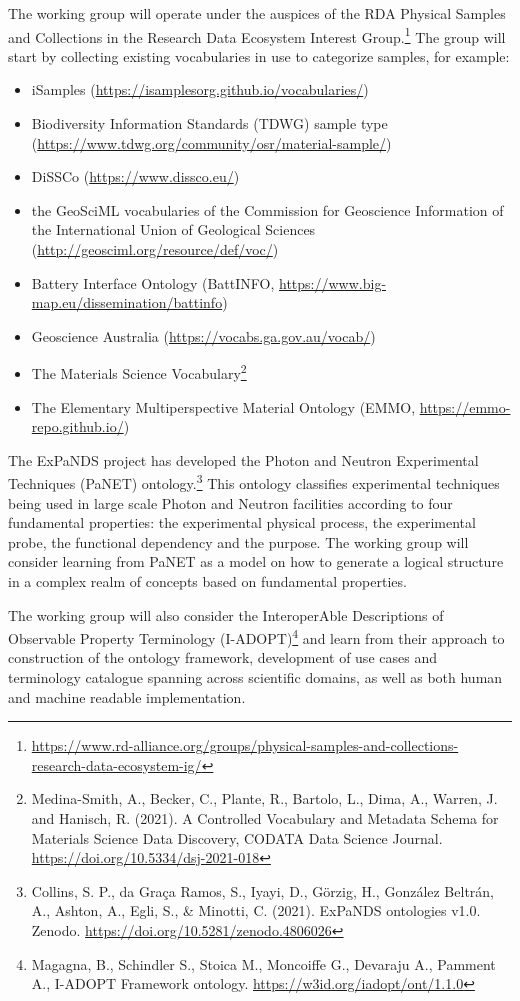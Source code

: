 \documentclass{scrartcl}
\begin{document}
The working group will operate under the auspices of the RDA Physical
Samples and Collections in the Research Data Ecosystem Interest
Group.\footnote{\url{https://www.rd-alliance.org/groups/physical-samples-and-collections-research-data-ecosystem-ig/}}
The group will start by collecting existing vocabularies in use to
categorize samples, for example:
\begin{itemize}
\item iSamples (\url{https://isamplesorg.github.io/vocabularies/})
\item Biodiversity Information Standards (TDWG) sample type
  (\url{https://www.tdwg.org/community/osr/material-sample/})
\item DiSSCo (\url{https://www.dissco.eu/})
\item the GeoSciML vocabularies of the Commission for Geoscience
  Information of the International Union of Geological Sciences
  (\url{http://geosciml.org/resource/def/voc/})
\item Battery Interface Ontology (BattINFO,
  \url{https://www.big-map.eu/dissemination/battinfo})
\item Geoscience Australia (\url{https://vocabs.ga.gov.au/vocab/})
\item The Materials Science Vocabulary\footnote{Medina-Smith, A.,
    Becker, C., Plante, R., Bartolo, L., Dima, A., Warren, J. and
    Hanisch, R. (2021).  A Controlled Vocabulary and Metadata Schema
    for Materials Science Data Discovery, CODATA Data Science Journal.
    \url{https://doi.org/10.5334/dsj-2021-018}}
\item The Elementary Multiperspective Material Ontology (EMMO,
  \url{https://emmo-repo.github.io/})
\end{itemize}

The ExPaNDS project has developed the Photon and Neutron Experimental
Techniques (PaNET) ontology.\footnote{Collins, S. P., da Graça Ramos,
  S., Iyayi, D., Görzig, H., González Beltrán, A., Ashton, A., Egli,
  S., \& Minotti, C. (2021). ExPaNDS ontologies
  v1.0. Zenodo. \url{https://doi.org/10.5281/zenodo.4806026}}
This ontology classifies experimental techniques being used in large
scale Photon and Neutron facilities according to four fundamental
properties: the experimental physical process, the experimental probe,
the functional dependency and the purpose.  The working group will
consider learning from PaNET as a model on how to generate a logical
structure in a complex realm of concepts based on fundamental
properties.

The working group will also consider the InteroperAble Descriptions of
Observable Property Terminology (I-ADOPT)\footnote{Magagna, B.,
  Schindler S., Stoica M., Moncoiffe G., Devaraju A., Pamment A.,
  I-ADOPT Framework ontology.
  \url{https://w3id.org/iadopt/ont/1.1.0}}
and learn from their approach to construction of the ontology
framework, development of use cases and terminology catalogue spanning
across scientific domains, as well as both human and machine readable
implementation.
\end{document}
